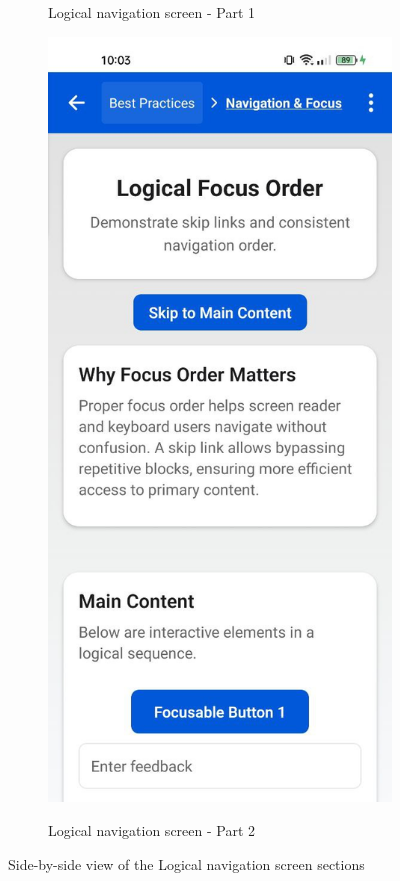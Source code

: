 \begin{figure}[ht]
\begin{subfigure}[b]{0.48\textwidth}
        \caption{Logical navigation screen - Part 1}
        \label{fig:logical-left}
    \end{subfigure}
    \hfill
    \begin{subfigure}[b]{0.48\textwidth}
        \centering
        \includegraphics[width=\linewidth, alt={Second part of the Logical navigation screen}]{img/logical2.jpg}
        \caption{Logical navigation screen - Part 2}
        \label{fig:logical-right}
    \end{subfigure}
    \caption{Side-by-side view of the Logical navigation screen sections}
    \label{fig:logical_screens_sidebyside}
\end{figure}

